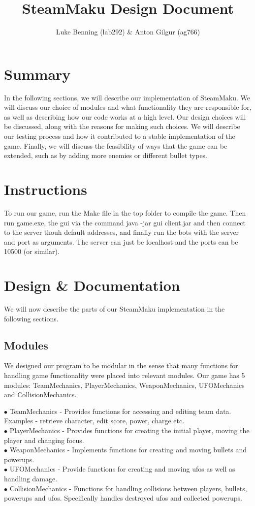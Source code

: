\documentclass{article}
\begin{document}
\title{SteamMaku Design Document}
\author{Luke Benning (lab292) \& Anton Gilgur (ag766)}

\maketitle

\section{Summary}
In the following sections, we will describe our implementation of SteamMaku. We will discuss our choice of modules and what functionality they are responsible for, as well as describing how our code works at a high level. Our design choices will be discussed, along with the reasons for making such choices. We will describe our testing process and how it contributed to a stable implementation of the game. Finally, we will discuss the feasibility of ways that the game can be extended, such as by adding more enemies or different bullet types.

\section{Instructions}
To run our game, run the Make file in the top folder to compile the game. Then run game.exe, the gui via the command
java -jar gui client.jar and then connect to the server thouh default addresses, and finally run the bots with the server and port as arguments.
The server can just be localhost and the ports can be 10500 (or similar).

\section{Design \& Documentation}
We will now describe the parts of our SteamMaku implementation in the following sections.

\subsection{Modules}
We designed our program to be modular in the sense that many functions for handling game functionality were placed into relevant modules.
Our game has 5 modules: TeamMechanics, PlayerMechanics, WeaponMechanics, UFOMechanics and CollisionMechanics.

$\bullet$ TeamMechanics - Provides functions for accessing and editing team data. Examples - retrieve character, edit score, power, charge etc. \\
$\bullet$ PlayerMechanics - Provides functions for creating the initial player, moving the player and changing focus. \\
$\bullet$ WeaponMechanics - Implements functions for creating and moving bullets and powerups. \\
$\bullet$ UFOMechanics - Provide functions for creating and moving ufos as well as handling damage. \\
$\bullet$ CollisionMechanics - Functions for handling collisions between players, bullets, powerups and ufos.  Specifically handles destroyed ufos and collected powerups. \\
\end{document}
